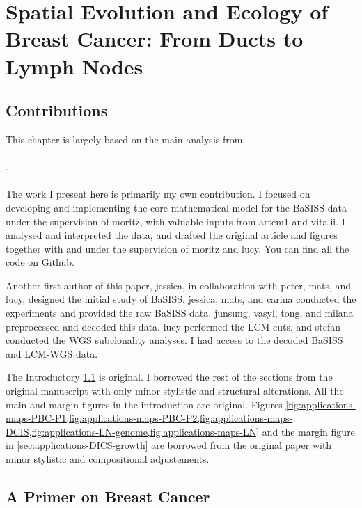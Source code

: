 \chapter{Spatial Evolution and Ecology of Breast Cancer: From Ducts to Lymph Nodes}
\label{sec:chapter-basiss-applications}

\section*{Contributions}
This chapter is largely based on the main analysis from:
\\~\\
 . 
\\~\\
The work I present here is primarily my own contribution. I focused on developing and implementing the core mathematical model for the \acs{BaSISS} data under the supervision of \ac{moritz}, with valuable inputs from \ac{artem1} and \ac{vitalii}. I analysed and interpreted the data, and drafted the original article and figures together with and under the supervision of \ac{moritz} and \ac{lucy}. You can find all the code on \href{https://github.com/gerstung-lab/BaSISS}{Github}.

Another first author of this paper, \ac{jessica}, in collaboration with \ac{peter}, \ac{mats}, and \ac{lucy}, designed the initial study of \acs{BaSISS}. \ac{jessica}, \ac{mats}, and \ac{carina} conducted the experiments and provided the raw \acs{BaSISS} data. \ac{junsung}, \ac{vasyl}, \ac{tong}, and \ac{milana} preprocessed and decoded this data. \ac{lucy} performed the \acs{LCM} cuts, and \ac{stefan} conducted the \acs{WGS} subclonality analyses. I had access to the decoded \acs{BaSISS} and \acs{LCM}-\acs{WGS} data.

The Introductory \cref{sec:applications-breast-intro} is original. I borrowed the rest of the sections from the original manuscript with only minor stylistic and structural alterations. All the main and margin figures in the introduction are original. Figures \cref{fig:applications-maps-PBC-P1,fig:applications-maps-PBC-P2,fig:applications-maps-DCIS,fig:applications-LN-genome,fig:applications-maps-LN} and the margin figure in \cref{sec:applications-DICS-growth} are borrowed from the original paper with minor stylistic and compositional adjustements.

\section{A Primer on Breast Cancer}
\label{sec:applications-breast-intro}

